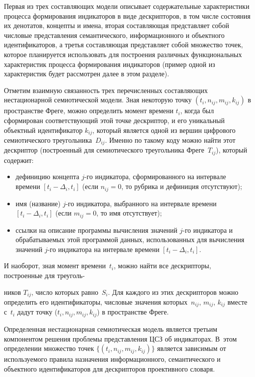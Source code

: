\begin{multicols}{2}
   Первая из трех составляющих модели описывает содержательные характеристики 
процесса формирования индикаторов в виде дескрипторов, в том числе состояния их 
денотатов, концепты и имена, вторая составляющая представляет собой числовые 
представления семантического, информационного и объектного идентификаторов, а третья 
составляющая представляет собой множество точек, которое планируется использовать для 
построения различных функциональных характеристик процесса формирования индикаторов 
(пример одной из характеристик будет рассмотрен далее в этом раз\-деле).
{

}
   
   Отметим взаимную связанность трех перечисленных составляющих нестационарной 
семиотической модели. Зная некоторую точку $(t_i, n_{ij}, m_{ij}, k_{ij})$ в пространстве 
Фреге, можно определить момент времени $t_i$, когда был сформирован соответствующий 
этой точке дескриптор, и его уникальный объектный идентификатор $k_{ij}$, который 
является одной из вершин цифрового семиотического треугольника~$D_{ij}$. Именно по 
такому коду можно найти этот дескриптор (построенный для семиотического треугольника 
Фреге~$T_{ij}$), который содержит:
   \begin{itemize}
   \item дефиницию концепта $j$-го индикатора, сформированного на интервале времени 
$[t_i -\Delta_i, t_i]$ (если $n_{ij}=0$, то рубрика и дефиниция отсутствуют);
   \item имя (название) $j$-го индикатора, выбранного на интервале времени $[t_i -\Delta_i, 
t_i]$ (если $m_{ij}=0$, то имя отсутствует);
   \item ссылки на описание программы вычисления значений $j$-го индикатора и 
обрабатываемых этой программой данных, использованных для вычисления значений $j$-го 
индикатора на интервале времени $[t_i -\Delta_i, t_i]$.
   \end{itemize}
   
   И наоборот, зная момент времени~$t_i$, можно найти все дескрипторы, построенные для 
треуголь-\linebreak\vspace*{-12pt}
\pagebreak

\noindent
ников $T_{ij}$, число которых равно~$S_i$. Для каждого из этих дескрипторов 
можно определить его идентификаторы, числовые значения которых~$n_{ij}$, $m_{ij}$, 
$k_{ij}$ вместе с~$t_i$ дадут точку ($t_i, n_{ij}, m_{ij}, k_{ij}$) в пространстве Фреге.
   
   Определенная нестационарная семиотическая модель является третьим компонентом 
решения проблемы представления ЦСЗ об индикаторах. В~этом определении множество 
точек $\{(t_i, n_{ij}, m_{ij}, k_{ij})\}$ является зависимым от используемого правила 
назначения информационного, семантического и объектного идентификаторов для 
дескрипторов проективного словаря.
   

\end{multicols}
